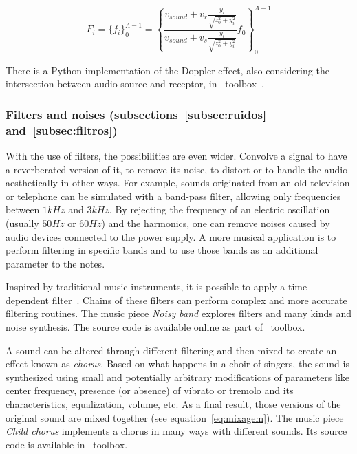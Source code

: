 \begin{equation}\label{eq:ffDoppler}
    F_i=\{f_i\}_0^{\Lambda-1}=\left\{\frac{v_{sound} + v_r\frac{y_i}{\sqrt{z_0^2+y_i^2}}}{v_{sound}+v_s\frac{y_i}{\sqrt{z_0^2+y_i^2}}}f_0\right\}_0^{\Lambda-1}
\end{equation}

There is a Python implementation of the Doppler effect, also considering the intersection between audio source and receptor, in \massa\ toolbox~\cite{MASSA}.

\subsubsection{Filters and noises (subsections~\ref{subsec:ruidos} and~\ref{subsec:filtros})}
With the use of filters, the possibilities are even wider.
Convolve a signal to have a reverberated version of it, to remove its noise, to distort or to handle
the audio aesthetically in other ways. For example, sounds originated from an old television or telephone can be simulated with a band-pass filter, allowing only frequencies between $1kHz$ and $3kHz$. By rejecting the frequency of an electric oscillation (usually $50Hz$ or $60Hz$) and the harmonics, one can remove noises caused by audio devices connected to the power supply. A more musical application is to perform filtering in specific bands and to use those bands as an additional parameter to the notes.

Inspired by traditional music instruments, it is possible to apply a
time-dependent filter~\cite{Roederer}. Chains of these filters can perform complex and more accurate filtering routines. The music piece \emph{Noisy band} explores filters and many kinds and noise synthesis. The source code is available online as part of \massa\ toolbox.

A sound can be altered through different filtering and then mixed to create an effect known as \emph{chorus}. Based on what happens in a choir of singers, the sound is synthesized using small and potentially arbitrary modifications of parameters like center frequency, presence (or absence) of vibrato or tremolo and its characteristics, equalization, volume, etc. As a final result, those versions of the original sound are mixed together (see equation~\ref{eq:mixagem}). The music piece \emph{Child chorus} implements a chorus in many ways with different sounds. Its source code is available in \massa\ toolbox.

